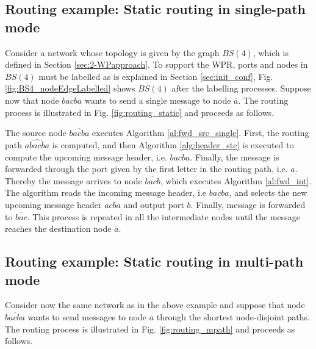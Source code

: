 

\subsection{Routing example: Static routing in single-path mode}

Consider a network whose topology is given by the graph $BS(4)$, which is defined in Section \ref{sec:2-WPapproach}. To support the WPR, ports and nodes in $BS(4)$ must be labelled as is explained in Section \ref{sec:init_conf}, Fig. \ref{fig:BS4_nodeEdgeLabelled} shows $BS(4)$ after the labelling processes. Suppose now that node $\overline{bacba}$ wants to send a single message to node $\overline{a}$. The routing process is illustrated in Fig. \ref{fig:routing_static}  and proceeds as follows.

The source node $\overline{bacba}$ executes Algorithm \ref{al:fwd_src_single}. First, the routing path $\widehat{abacba}$ is computed, and then  Algorithm \ref{alg:header_stc} is executed to compute the upcoming message header, i.e. $bacba$. Finally, the message is forwarded through the port given by the first letter in the routing path, i.e. $a$.
Thereby the message arrives to node $\overline{bacb}$, which executes Algorithm \ref{al:fwd_int}. The algorithm reads the incoming message header, i.e $bacba$, and selects the new upcoming message header $acba$ and output port $b$. Finally, message is forwarded to $\overline{bac}$. This process is repeated in all the intermediate nodes until the message reaches the destination node $\overline{a}$.



\subsection{Routing example: Static routing in multi-path mode}

Consider now the same network as in the above example and suppose that node $\overline{bacba}$ wants to send messages to node $\overline{a}$ through the shortest node-disjoint paths. The routing process is illustrated in Fig. \ref{fig:routing_mpath}  and proceeds as follows.


